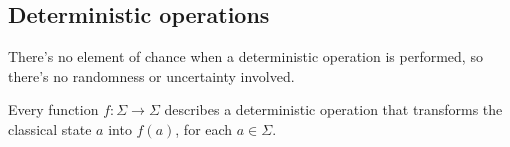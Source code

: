 \subsection{Deterministic operations}
There's no element of chance when a deterministic operation is performed, so there's no randomness or uncertainty involved.

\bigbreak

Every function $f:\Sigma\rightarrow\Sigma$ describes a deterministic operation that transforms the classical state $a$ into $f(a)$, for each $a\in\Sigma$.


